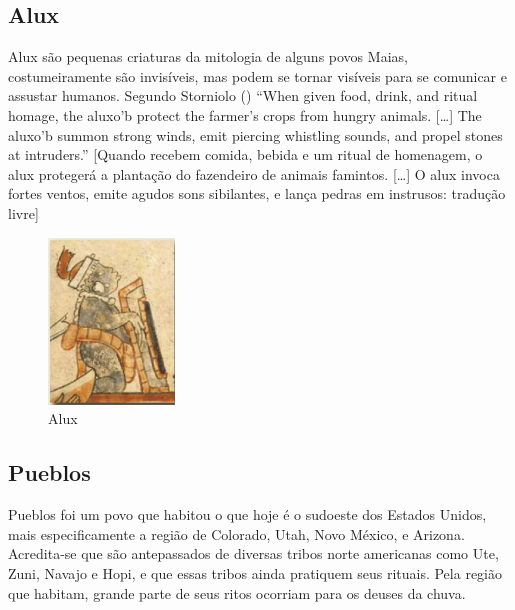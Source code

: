 \subsection{Alux}

Alux são pequenas criaturas da mitologia de alguns povos Maias, costumeiramente
são invisíveis, mas podem se tornar visíveis para se comunicar e assustar
humanos. Segundo Storniolo (\citeyear{storniolo2009out}) ``When given food,
drink, and ritual homage, the aluxo'b protect the farmer’s crops from hungry
animals. [\ldots] The aluxo'b summon strong winds, emit piercing whistling
sounds, and propel stones at intruders.'' [Quando recebem comida, bebida e
um ritual de homenagem, o alux protegerá a plantação do fazendeiro de
animais famintos. [\ldots] O alux invoca fortes ventos, emite agudos sons
sibilantes, e lança pedras em instrusos: tradução livre]

\clearpage

\begin{figure}[!htb] \caption{\label{fig_alux}Alux} \begin{center}
\includegraphics[width=0.3\textwidth]{imagens/alux.jpg} \end{center}
 \end{figure}

\subsection{Pueblos}

Pueblos foi  um povo que habitou o que hoje é o sudoeste dos Estados Unidos,
mais especificamente a região de Colorado, Utah, Novo México, e
Arizona.\cite{civPerdidas2017,lyneis1995virgin}
Acredita-se que são antepassados de diversas tribos norte americanas como Ute,
Zuni, Navajo e Hopi, e que essas tribos ainda pratiquem seus rituais. Pela
região que habitam, grande parte de seus ritos ocorriam para os deuses da
chuva\cite{abreu94}.

